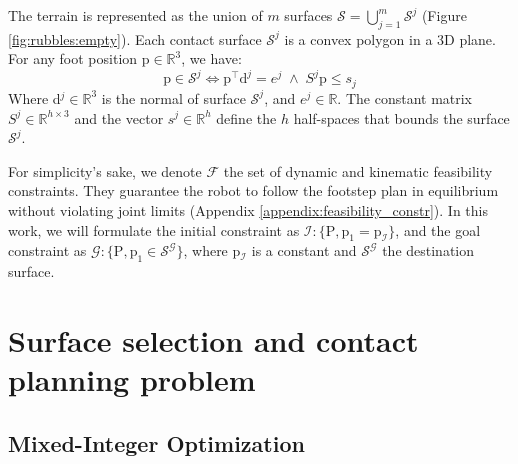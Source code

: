 The terrain is represented as the union of $m$ surfaces $\mathcal{S}= \bigcup_{j=1}^m \mathcal{S}^j$ (Figure \ref{fig:rubbles:empty}). 
Each contact surface $\mathcal{S}^j$ is a convex polygon in a 3D plane. 
For any foot position p$ \in \mathbb{R}^{3}$, we have:
\begin{equation}
\label{eq:p_in_S}
    \mbox{p} \in \mathcal{S}^j \iff  \mbox{p}^{\intercal} \mbox{d}^j = e^j \; \land \; S^j \mbox{p} \leq s_j 
\end{equation}
Where d$^j \in \mathbb{R}^3$ is the normal of surface $\mathcal{S}^j$, and $e^j \in \mathbb{R}$. The constant matrix $S^j \in \mathbb{R}^{h \times 3}$ and the vector $s^j \in \mathbb{R}^h$ define the $h$ half-spaces that bounds the surface $\mathcal{S}^j$.

For simplicity's sake, we denote $\mathcal{F}$ the set of dynamic and kinematic feasibility constraints. 
They guarantee the robot to follow the footstep plan in equilibrium without violating joint limits (Appendix \ref{appendix:feasibility_constr}).
In this work, we will formulate the initial constraint as $\mathcal{I} : \{\mbox{P}, \mbox{p}_1 = \mbox{p}_{\mathcal{I}}\}$, and the goal constraint as $\mathcal{G} : \{\mbox{P}, \mbox{p}_1 \in \mathcal{S}^{\mathcal{G}} \}$, where p$_{\mathcal{I}}$ is a constant and $\mathcal{S}^{\mathcal{G}}$ the destination surface.


\section{Surface selection and contact planning problem}
\label{sub:mip:mip}

\subsection{Mixed-Integer Optimization}


